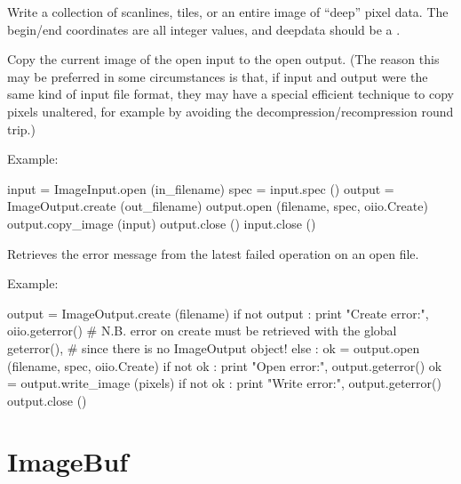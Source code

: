 
Write a collection of scanlines, tiles, or an entire image of ``deep''
pixel data. The begin/end coordinates are all integer values, and
{\cf deepdata} should be a \DeepData.
\apiend

Copy the current image of the open input to the open output. (The reason
this may be preferred in some circumstances is that, if input and
output were the same kind of input file format, they may have a special
efficient technique to copy pixels unaltered, for example by avoiding the 
decompression/recompression round trip.)

\noindent Example:
\begin{code}
    input = ImageInput.open (in_filename)
    spec = input.spec ()
    output = ImageOutput.create (out_filename)
    output.open (filename, spec, oiio.Create)
    output.copy_image (input)
    output.close ()
    input.close ()
\end{code}
\apiend

Retrieves the error message from the latest failed operation on an open
file.

\noindent Example:
\begin{code}
    output = ImageOutput.create (filename)
    if not output :
        print "Create error:", oiio.geterror()
        # N.B. error on create must be retrieved with the global geterror(),
        # since there is no ImageOutput object!
    else :
        ok = output.open (filename, spec, oiio.Create)
        if not ok :
            print "Open error:", output.geterror()
        ok = output.write_image (pixels)
        if not ok :
            print "Write error:", output.geterror()
        output.close ()
\end{code}
\apiend



\section{ImageBuf}
\label{sec:pythonimagebuf}

